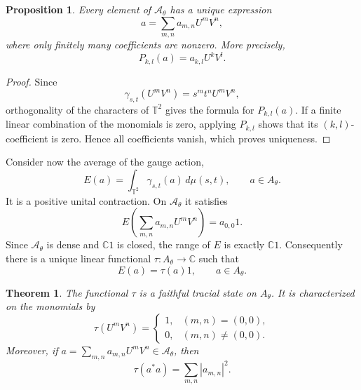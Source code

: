 \documentclass{book}
\newtheorem{proposition}[definition]{Proposition}
\newtheorem{theorem}[definition]{Theorem}
\begin{document}
\begin{proposition}\label{prop:uniqueFourierPolynomial}
Every element of \(\mathcal A_\theta\) has a unique expression
\[
a=\sum_{m,n}a_{m,n}U^mV^n,
\]
where only finitely many coefficients are nonzero. More precisely,
\[
P_{k,l}(a)=a_{k,l}U^kV^l.
\]
\end{proposition}

\begin{proof}
Since
\[
\gamma_{s,t}(U^mV^n)=s^mt^nU^mV^n,
\]
orthogonality of the characters of \(\mathbb T^2\) gives the formula for
\(P_{k,l}(a)\). If a finite linear combination of the monomials is zero,
applying \(P_{k,l}\) shows that its \((k,l)\)-coefficient is zero. Hence all
coefficients vanish, which proves uniqueness.
\end{proof}

Consider now the average of the gauge action,
\[
E(a)=\int_{\mathbb T^2}\gamma_{s,t}(a)\,d\mu(s,t),
\qquad a\in A_\theta.
\]
It is a positive unital contraction. On \(\mathcal A_\theta\) it satisfies
\[
E\left(\sum_{m,n}a_{m,n}U^mV^n\right)=a_{0,0}1.
\]
Since \(\mathcal A_\theta\) is dense and \(\mathbb C1\) is closed, the
range of \(E\) is exactly \(\mathbb C1\). Consequently there is a unique
linear functional \(\tau:A_\theta\to\mathbb C\) such that
\[
E(a)=\tau(a)1,
\qquad a\in A_\theta.
\]

\begin{theorem}\label{thm:canonicalTraceRotationAlgebra}
The functional \(\tau\) is a faithful tracial state on \(A_\theta\). It is
characterized on the monomials by
\[
\tau(U^mV^n)
=
\begin{cases}
1,&(m,n)=(0,0),\\
0,&(m,n)\ne(0,0).
\end{cases}
\]
Moreover, if
\(a=\sum_{m,n}a_{m,n}U^mV^n\in\mathcal A_\theta\), then
\[
\tau(a^*a)=\sum_{m,n}|a_{m,n}|^2.
\]
\end{theorem}
\end{document}
